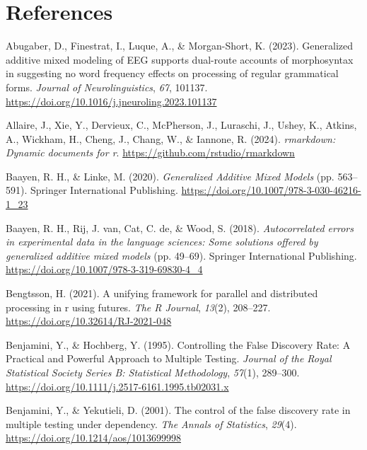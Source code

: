 \documentclass[
  doc,
  floatsintext,
  longtable,
  a4paper,
  nolmodern,
  notxfonts,
  notimes,
  colorlinks=true,linkcolor=blue,citecolor=blue,urlcolor=blue]{apa7}
\newlength{\cslhangindent}
\newenvironment{CSLReferences}[2] %
 {\begin{list}{}{%
  \setlength{\itemindent}{0pt}
  \setlength{\leftmargin}{0pt}
  \setlength{\parsep}{0pt}
  \ifodd #1
   \setlength{\leftmargin}{\cslhangindent}
   \setlength{\itemindent}{-1\cslhangindent}
  \fi
  \setlength{\itemsep}{#2\baselineskip}}}
 {\end{list}}
\begin{document}
\section{References}\label{references}

\label{refs}
\begin{CSLReferences}{1}{0}
Abugaber, D., Finestrat, I., Luque, A., \& Morgan-Short, K. (2023).
Generalized additive mixed modeling of EEG supports dual-route accounts
of morphosyntax in suggesting no word frequency effects on processing of
regular grammatical forms. \emph{Journal of Neurolinguistics},
\emph{67}, 101137.
\url{https://doi.org/10.1016/j.jneuroling.2023.101137}

Allaire, J., Xie, Y., Dervieux, C., McPherson, J., Luraschi, J., Ushey,
K., Atkins, A., Wickham, H., Cheng, J., Chang, W., \& Iannone, R.
(2024). \emph{{rmarkdown}: Dynamic documents for r}.
\url{https://github.com/rstudio/rmarkdown}

Baayen, R. H., \& Linke, M. (2020). \emph{Generalized Additive Mixed
Models} (pp. 563--591). Springer International Publishing.
\url{https://doi.org/10.1007/978-3-030-46216-1_23}

Baayen, R. H., Rij, J. van, Cat, C. de, \& Wood, S. (2018).
\emph{Autocorrelated errors in experimental data in the language
sciences: Some solutions offered by generalized additive mixed models}
(pp. 49--69). Springer International Publishing.
\url{https://doi.org/10.1007/978-3-319-69830-4_4}

Bengtsson, H. (2021). A unifying framework for parallel and distributed
processing in r using futures. \emph{The R Journal}, \emph{13}(2),
208--227. \url{https://doi.org/10.32614/RJ-2021-048}

Benjamini, Y., \& Hochberg, Y. (1995). Controlling the False Discovery
Rate: A Practical and Powerful Approach to Multiple Testing.
\emph{Journal of the Royal Statistical Society Series B: Statistical
Methodology}, \emph{57}(1), 289--300.
\url{https://doi.org/10.1111/j.2517-6161.1995.tb02031.x}

Benjamini, Y., \& Yekutieli, D. (2001). The control of the false
discovery rate in multiple testing under dependency. \emph{The Annals of
Statistics}, \emph{29}(4). \url{https://doi.org/10.1214/aos/1013699998}


\end{CSLReferences}
\end{document}
